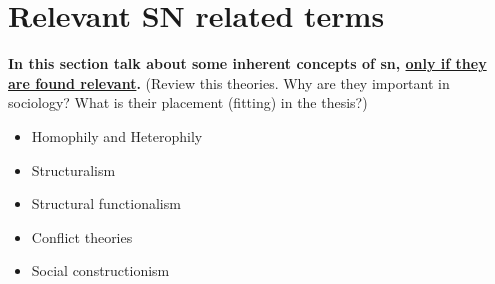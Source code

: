 \section{Relevant SN related terms}
\textbf{In this section talk about some inherent concepts of \gls{sn}, \underline{only if they are found relevant}.}
(Review this theories. Why are they important in sociology? What is their placement (fitting) in the thesis?)
\begin{itemize}
\item Homophily and Heterophily
\item Structuralism
\item Structural functionalism
\item Conflict theories
\item Social constructionism
\end{itemize}
